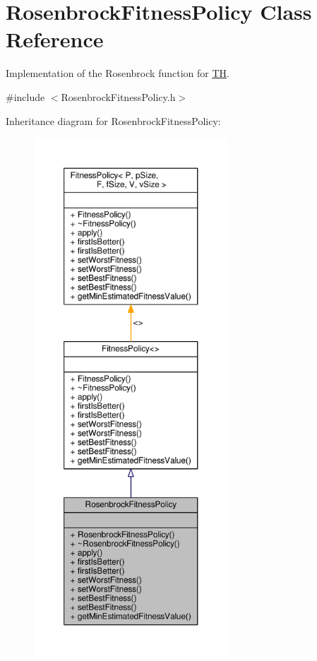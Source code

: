 \hypertarget{classRosenbrockFitnessPolicy}{}\section{Rosenbrock\+Fitness\+Policy Class Reference}
\label{classRosenbrockFitnessPolicy}


Implementation of the Rosenbrock function for \hyperlink{classTH}{TH}.  




{\ttfamily \#include $<$Rosenbrock\+Fitness\+Policy.\+h$>$}



Inheritance diagram for Rosenbrock\+Fitness\+Policy\+:
\nopagebreak
\begin{figure}[H]
\begin{center}
\leavevmode
\includegraphics[height=550pt]{classRosenbrockFitnessPolicy__inherit__graph}
\end{center}
\end{figure}


